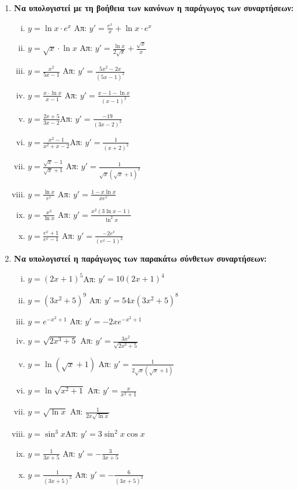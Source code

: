 \begin{enumerate}
  \item {\bfseries Να υπολογιστεί με τη βοήθεια των κανόνων η παράγωγος των συναρτήσεων:}
    \begin{enumerate}[i)]
      \item $ y= \ln{x} \cdot e^{x} $ 
        \hfill Απ: $ y'= \frac{e^{x}}{x} + \ln{x}\cdot e^{x} $ 
      \item $ y= \sqrt{x}\cdot \ln{x} $ 
        \hfill Απ: $ y'= \frac{\ln{x}}{2 \sqrt{ x }}  + \frac{\sqrt{ x }}{x} $ 
      \item $ y= \frac{x^{2}}{5x-1} $ \hfill Απ: $ y'= \frac{5x^{2}-2x}{(5x-1)^{2}} $  
      \item $ y = \frac{x\cdot \ln{x}}{x-1} $ 
        \hfill Απ: $ y' = \frac{x-1- \ln{x}}{(x-1)^{2}} $ 
      \item $y=\frac{2x+5}{3x-2}$\hfill Απ: $y'=\frac{-19}{(3x-2)^2}$
      \item $y=\frac{x^2-1}{x^2+x-2}$\hfill Απ: $y'=\frac{1}{(x+2)^2}$
      \item $y=\frac{\sqrt{x}-1}{\sqrt{x}+1}$
        \hfill Απ: $y'=\frac{1}{\sqrt{x}(\sqrt{x}+1)^2}$
      \item $ y= \frac{\ln{x}}{e^{x}} $ \hfill Απ: $ y'= \frac{1 - x \ln{x}}{xe^{x}} $ 
      \item $ y= \frac{x^{3}}{\ln{x}} $ 
        \hfill Απ: $ y' = \frac{x^{2}(3 \ln{x} -1)}{\ln^{2}{x} } $ 
      \item $ y= \frac{e^{x}+1}{e^{x}-1} $ 
        \hfill Απ: $ y'= \frac{-2e^{x}}{(e^{x}-1)^{2}} $ 
    \end{enumerate}

  \item {\bfseries Να υπολογιστεί η παράγωγος των παρακάτω σύνθετων συναρτήσεων:}
    \begin{enumerate}[i)]
      \item $y=(2x+1)^5$\hfill Απ: $y'=10(2x+1)^4$
      \item $ y=(3x^{2}+5)^{9} $ \hfill Απ: $ y'=54x(3x^{2}+5)^{8} $ 
      \item $ y=e^{-x^{2}+1} $ \hfill Απ: $ y'=-2x e^{-x^{2}+1} $ 
      \item $ y= \sqrt{2x^{3}+5} $ \hfill Απ: $ y'= \frac{3x^{2}}{\sqrt{2x^{3}+5}} $ 
      \item $ y= \ln{(\sqrt{ x } +1)} $ 
        \hfill Απ: $ y'= \frac{1}{2 \sqrt{ x } (\sqrt{ x } +1)} $ 
      \item $y= \ln{\sqrt{x^{2}+1}} $ \hfill Απ: $ y'= \frac{x}{x^{2}+1} $ 
      \item $ y= \sqrt{ \ln{x} } $ \hfill Απ: $ \frac{1}{2x \sqrt{ \ln{x} }} $ 
      \item $y=\sin^3 x$\hfill Απ: $y'=3\sin^2x \cos x$
      \item $y= \frac{1}{3x+5}$ \hfill Απ: $ y'= - \frac{3}{3x+5} $ 
      \item $y= \frac{1}{(3x+5)^{2}}$ \hfill Απ: $ y'= - \frac{6}{(3x+5)^{3}} $ 
    \end{enumerate}
\end{enumerate}







